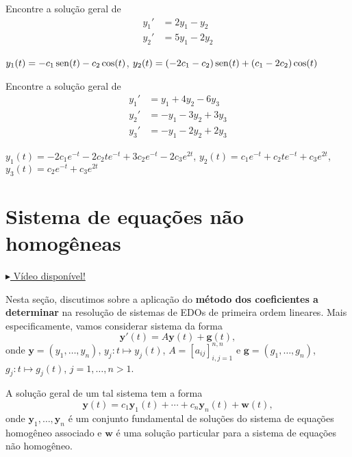 \begin{exer}
  Encontre a solução geral de
  \begin{align}
    y_1' &= 2y_1 - y_2 \\
    y_2' &= 5y_1 - 2y_2
  \end{align}
\end{exer}
\begin{resp}
  $y_1(t) = -c_1\operatorname{sen}(t) - c_2\cos(t)$, $y_2(t) = (-2c_1-c_2)\operatorname{sen}(t) + (c_1 -2c_2)\cos(t)$
\end{resp}

\begin{exer}
  Encontre a solução geral de
  \begin{align}
    y_1' &= y_1 + 4y_2 - 6y_3 \\
    y_2' &= -y_1 -3y_2 + 3y_3 \\
    y_3' &= -y_1 -2y_2 + 2y_3
  \end{align}
\end{exer}
\begin{resp}
  $y_1(t) = -2c_1e^{-t}-2c_2te^{-t}+3c_2e^{-t}-2c_3e^{2t}$, $y_2(t)=c_1e^{-t}+c_2te^{-t}+c_3e^{2t}$, $y_3(t) = c_2e^{-t}+c_3e^{2t}$
\end{resp}


\section{Sistema de equações não homogêneas}\label{cap_edosis1_sec_eqnh}

\begin{flushright}
  \href{https://archive.org/details/sistema-edos-nh}{$\blacktriangleright$ Vídeo disponível!}
\end{flushright}

Nesta seção, discutimos sobre a aplicação do {\bf método dos coeficientes a determinar} na resolução de sistemas de EDOs de primeira ordem lineares. Mais especificamente, vamos considerar sistema da forma
\begin{equation}
  \pmb{y}'(t) = A\pmb{y}(t) + \pmb{g}(t),
\end{equation}
onde $\pmb{y} = (y_1, \dotsc, y_n)$, $y_j:t\mapsto y_j(t)$, $A = [a_{ij}]_{i,j=1}^{n,n}$ e $\pmb{g} = (g_1, \dotsc, g_n)$, $g_j:t\mapsto g_j(t)$, $j=1, \dotsc, n>1$.

A solução geral de um tal sistema tem a forma
\begin{equation}
  \pmb{y}(t) = c_1\pmb{y}_1(t) + \cdots + c_n\pmb{y}_n(t) + \pmb{w}(t),
\end{equation}
onde $\pmb{y}_1, \dotsc, \pmb{y}_n$ é um conjunto fundamental de soluções do sistema de equações homogêneo associado e $\pmb{w}$ é uma solução particular para a sistema de equações não homogêneo.


